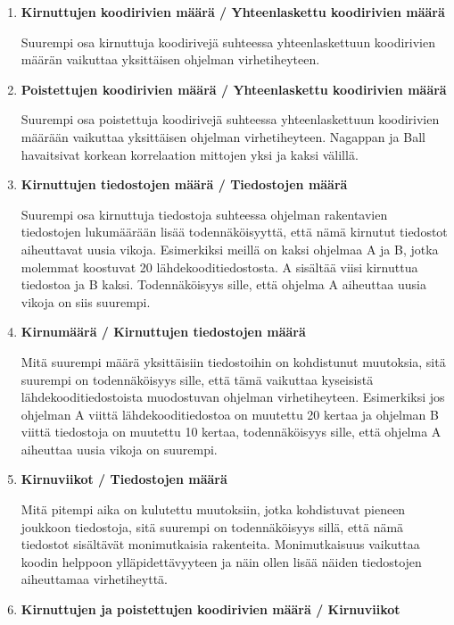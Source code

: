 \documentclass[finnish]{../tktltiki2}
\theoremstyle{definition}
\theoremstyle{remark}
\begin{document}
\begin{enumerate}
    
    \item {\bf Kirnuttujen koodirivien määrä / Yhteenlaskettu koodirivien määrä}
    
    Suurempi osa kirnuttuja koodirivejä suhteessa yhteenlaskettuun koodirivien määrän vaikuttaa yksittäisen ohjelman virhetiheyteen.
    
    \item {\bf Poistettujen koodirivien määrä / Yhteenlaskettu koodirivien määrä}
    
    Suurempi osa poistettuja koodirivejä suhteessa yhteenlaskettuun koodirivien määrään vaikuttaa yksittäisen ohjelman virhetiheyteen. Nagappan ja Ball havaitsivat korkean korrelaation mittojen yksi ja kaksi välillä.
    
    \item {\bf Kirnuttujen tiedostojen määrä / Tiedostojen määrä}
    
    Suurempi osa kirnuttuja tiedostoja suhteessa ohjelman rakentavien tiedostojen lukumäärään lisää todennäköisyyttä, että nämä kirnutut tiedostot aiheuttavat uusia vikoja. Esimerkiksi meillä on kaksi ohjelmaa A ja B, jotka molemmat koostuvat 20 lähdekooditiedostosta. A sisältää viisi kirnuttua tiedostoa ja B kaksi. Todennäköisyys sille, että ohjelma A aiheuttaa uusia vikoja on siis suurempi.
    
    \item {\bf Kirnumäärä / Kirnuttujen tiedostojen määrä}
    
    Mitä suurempi määrä yksittäisiin tiedostoihin on kohdistunut muutoksia, sitä suurempi on todennäköisyys sille, että tämä vaikuttaa kyseisistä lähdekooditiedostoista muodostuvan ohjelman virhetiheyteen. Esimerkiksi jos ohjelman A viittä lähdekooditiedostoa on muutettu 20 kertaa ja ohjelman B viittä tiedostoja on muutettu 10 kertaa, todennäköisyys sille, että ohjelma A aiheuttaa uusia vikoja on suurempi.

    \item {\bf Kirnuviikot / Tiedostojen määrä}
    
    Mitä pitempi aika on kulutettu muutoksiin, jotka kohdistuvat pieneen joukkoon tiedostoja, sitä suurempi on todennäköisyys sillä, että nämä tiedostot sisältävät monimutkaisia rakenteita. Monimutkaisuus vaikuttaa koodin helppoon ylläpidettävyyteen ja näin ollen lisää näiden tiedostojen aiheuttamaa virhetiheyttä.

    \item {\bf Kirnuttujen ja poistettujen koodirivien määrä / Kirnuviikot}
    

\end{enumerate}
\end{document}
